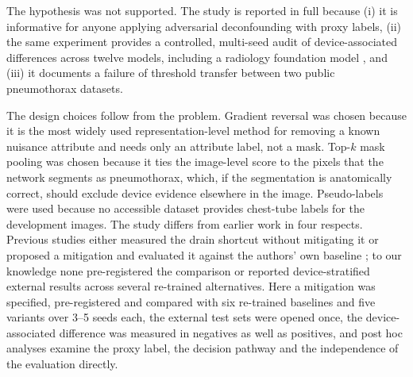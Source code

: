 \documentclass{ieeeaccess}
\begin{document}
The hypothesis was not supported. The study is reported in full because (i) it is informative for anyone applying adversarial deconfounding with proxy labels, (ii) the same experiment provides a controlled, multi-seed audit of device-associated differences across twelve models, including a radiology foundation model \cite{perezgarcia2025raddino}, and (iii) it documents a failure of threshold transfer between two public pneumothorax datasets.

The design choices follow from the problem. Gradient reversal \cite{ganin2015dann} was chosen because it is the most widely used representation-level method for removing a known nuisance attribute and needs only an attribute label, not a mask. Top-$k$ mask pooling was chosen because it ties the image-level score to the pixels that the network segments as pneumothorax, which, if the segmentation is anatomically correct, should exclude device evidence elsewhere in the image. Pseudo-labels were used because no accessible dataset provides chest-tube labels for the development images. The study differs from earlier work in four respects. Previous studies either measured the drain shortcut without mitigating it \cite{jimenez2023shortcuts,sourget2025clip,li2025featurequality} or proposed a mitigation and evaluated it against the authors' own baseline \cite{rueckel2021annotations,bandaru2026untreated}; to our knowledge none pre-registered the comparison or reported device-stratified external results across several re-trained alternatives. Here a mitigation was specified, pre-registered and compared with six re-trained baselines and five variants over 3--5 seeds each, the external test sets were opened once, the device-associated difference was measured in negatives as well as positives, and post hoc analyses examine the proxy label, the decision pathway and the independence of the evaluation directly.
\end{document}
